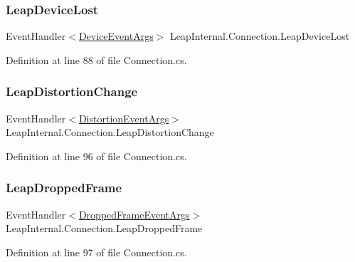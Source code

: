 \subsubsection{\texorpdfstring{LeapDeviceLost}{LeapDeviceLost}}
{\footnotesize\ttfamily Event\+Handler$<$\mbox{\hyperlink{class_leap_1_1_device_event_args}{Device\+Event\+Args}}$>$ Leap\+Internal.\+Connection.\+Leap\+Device\+Lost}



Definition at line 88 of file Connection.\+cs.

\mbox{\label{class_leap_internal_1_1_connection_ab1618ad3b9b1ed17ccd43a2461d277d7}} 
\subsubsection{\texorpdfstring{LeapDistortionChange}{LeapDistortionChange}}
{\footnotesize\ttfamily Event\+Handler$<$\mbox{\hyperlink{class_leap_1_1_distortion_event_args}{Distortion\+Event\+Args}}$>$ Leap\+Internal.\+Connection.\+Leap\+Distortion\+Change}



Definition at line 96 of file Connection.\+cs.

\mbox{\label{class_leap_internal_1_1_connection_a7542907a2116216ac90ab2a88599b3a6}} 
\subsubsection{\texorpdfstring{LeapDroppedFrame}{LeapDroppedFrame}}
{\footnotesize\ttfamily Event\+Handler$<$\mbox{\hyperlink{class_leap_1_1_dropped_frame_event_args}{Dropped\+Frame\+Event\+Args}}$>$ Leap\+Internal.\+Connection.\+Leap\+Dropped\+Frame}



Definition at line 97 of file Connection.\+cs.

\mbox{\label{class_leap_internal_1_1_connection_a2983273b0360e53dc42a7d6c6d2e5893}} 
